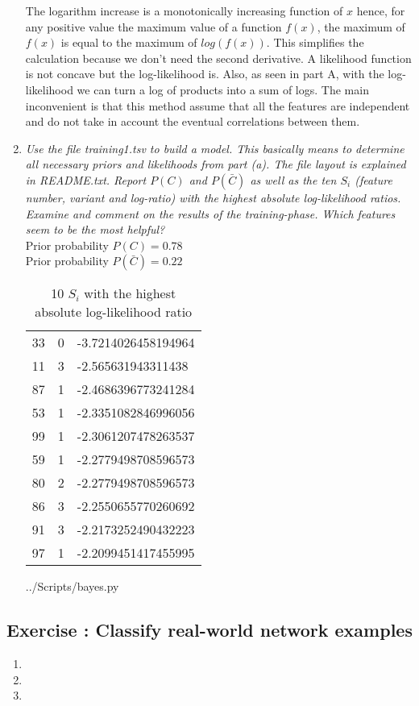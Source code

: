 \documentclass[10pt,a4paper]{article}
\newcommand{\exercise}[1]
{
  \stepcounter{subsection}
  \subsection*{Exercise \thesubsection: #1}

}
\begin{document}
\begin{enumerate}
The logarithm increase is a monotonically increasing function of $x$ hence, for any positive value the maximum value of a function $f(x)$, the maximum of $f(x)$ is equal to the maximum of $log(f(x))$. This simplifies the calculation because we don't need the second derivative. A likelihood function is not concave but the log-likelihood is. Also, as seen in part A, with the log-likelihood we can turn a log of products into a sum of logs. The main inconvenient is that this method assume that all the features are independent and do not take in account the eventual correlations between them. 




\newpage
\item \textit{Use the file training1.tsv to build a model. This basically means to determine all necessary
	priors and likelihoods from part (a). The file layout is explained in README.txt. Report
	$P(C)$ and $P(\bar{C})$ as well as the ten $S_i$ (feature number, variant and log-ratio) with the highest
	absolute log-likelihood ratios. Examine and comment on the results of the training-phase.
	Which features seem to be the most helpful?
}\\

Prior probability $P(C) = 0.78$\\
Prior probability $P(\bar{C}) = 0.22$\\

 



\begin{table}[H]
	\centering
	\caption{10 $S_i$ with the highest absolute log-likelihood ratio}
	\label{10most}
	\begin{tabular}{lll}
		33 & 0 & -3.7214026458194964 \\
		11 & 3 & -2.565631943311438  \\
		87 & 1 & -2.4686396773241284 \\
		53 & 1 & -2.3351082846996056 \\
		99 & 1 & -2.3061207478263537 \\
		59 & 1 & -2.2779498708596573 \\
		80 & 2 & -2.2779498708596573 \\
		86 & 3 & -2.2550655770260692 \\
		91 & 3 & -2.2173252490432223 \\
		97 & 1 & -2.2099451417455995
	\end{tabular}
\end{table}

 {../Scripts/bayes.py}


\end{enumerate}



\newpage
\exercise{Classify real-world network examples}
\begin{enumerate}
	\item 
	
	
	\item 
	
	
	\item 

\end{enumerate}
\end{document}
